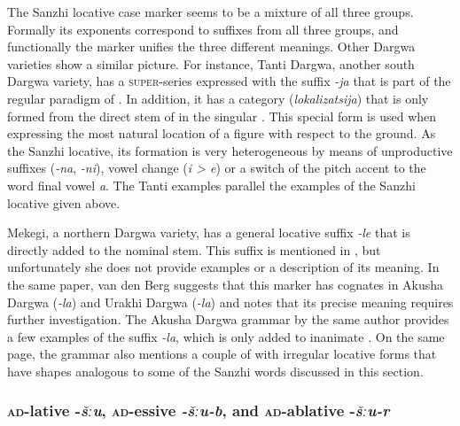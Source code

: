 The Sanzhi locative case marker seems to be a mixture of all three groups. Formally its exponents correspond to suffixes from all three groups, and functionally the marker unifies the three different meanings. Other Dargwa varieties show a similar picture. For instance, Tanti Dargwa, another south Dargwa variety, has a \textsc{super}-series expressed with the suffix \textit{-ja} that is part of the regular paradigm of . In addition, it has a category  (\textit{lokalizatsija}) that is only formed from the direct stem of  in the singular \citep[66]{Sumbatova.Lander2014}. This special form is used when expressing the most natural location of a figure with respect to the ground. As the Sanzhi locative, its formation is very heterogeneous by means of unproductive suffixes (\textit{-na}, \textit{-ni}), vowel change (\textit{i > e}) or a switch of the pitch accent to the word final vowel \textit{a}. The Tanti examples parallel the examples of the Sanzhi locative given above.

Mekegi, a northern Dargwa variety, has a general locative suffix \textit{-le} that is directly added to the nominal stem. This suffix is mentioned in , but unfortunately she does not provide examples or a description of its meaning. In the same paper, van den Berg suggests that this marker has cognates in Akusha Dargwa (\textit{-la}) and Urakhi Dargwa (\textit{-la}) and notes that its precise meaning requires further investigation. The Akusha Dargwa grammar by the same author provides a few examples of the suffix \textit{-la}, which is only added to inanimate  \citep[24]{vandenBerg2001}. On the same page, the grammar also mentions a couple of  with irregular locative forms that have shapes analogous to some of the Sanzhi words discussed in this section.




\subsubsection{\textsc{ad}-lative -\textit{šːu}, \textsc{ad}-essive \textit{-šːu-b}, and \textsc{ad}-ablative -\textit{šːu-r}}
\label{sssec:ad-lative -šːu, ad-essive -šːu-b, and ad-\isi{ablative} -šːu-r}


